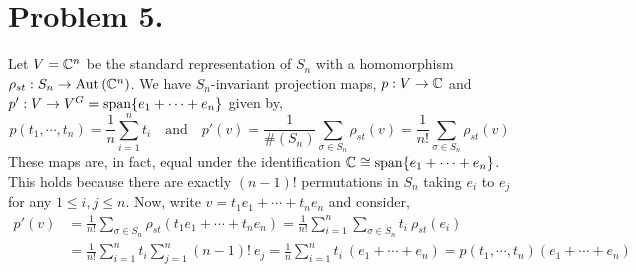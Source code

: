 \documentclass[12pt]{extarticle}
\begin{document}
\section*{Problem 5.}
Let $V = \mathbb{C}^n$ be the standard representation of $S_n$ with a homomorphism $\rho_{st} : S_n \to \mathrm{Aut}\left( \mathbb{C}^n \right)$. We have $S_n$-invariant projection maps, $p : V \to \mathbb{C}$ and $p' : V \to V^G = \mathrm{span}\! \left\{e_1 + \cdots + e_n \right\}$ given by,
\[ p(t_1, \cdots, t_n) = \frac{1}{n} \sum_{i = 1}^n t_i \quad \text{and} \quad p'(v) = \frac{1}{\#(S_n)} \sum_{\sigma \in S_n} \rho_{st}(v) = \frac{1}{n!} \sum_{\sigma \in S_n} \rho_{st}(v) \]
These maps are, in fact, equal under the identification $\mathbb{C} \cong \mathrm{span}\! \left\{e_1 + \cdots + e_n \right\}$. This holds because there are exactly $(n-1)!$ permutations in $S_n$ taking $e_i$ to $e_j$ for any $1 \le i, j \le n$. Now, write $v = t_1 e_1 + \cdots + t_n e_n$ and consider,
\begin{align*}
p'(v) & = \frac{1}{n!} \sum_{\sigma \in S_n} \rho_{st}(t_1 e_1 + \cdots + t_n e_n) = \frac{1}{n!} \sum_{i = 1}^n \sum_{\sigma \in S_n} t_i \: \rho_{st}(e_i)
\\
& = \frac{1}{n!} \sum_{i = 1}^n t_i \sum_{j = 1}^n (n - 1)! \: e_j = \frac{1}{n} \sum_{i = 1}^n t_i \: (e_1 + \cdots + e_n) = p(t_1, \cdots, t_n) (e_1 + \cdots + e_n)
\end{align*}
\end{document}
